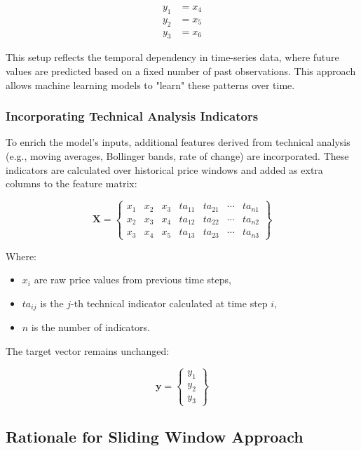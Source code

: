 \documentclass[a4paper,11pt]{article}
\begin{document}
\begin{align*}
y_1 &= x_4 \\
y_2 &= x_5 \\
y_3 &= x_6
\end{align*}

This setup reflects the temporal dependency in time-series data, where future values are predicted based on a fixed number of past observations. This approach allows machine learning models to "learn" these patterns over time.

\subsubsection{Incorporating Technical Analysis Indicators}

To enrich the model’s inputs, additional features derived from technical analysis (e.g., moving averages, Bollinger bands, rate of change) are incorporated. These indicators are calculated over historical price windows and added as extra columns to the feature matrix:

\begin{equation*}
\mathbf{X} = \begin{Bmatrix}
x_1 & x_2 & x_3 & ta_{11} & ta_{21} & \cdots & ta_{n1}\\
x_2 & x_3 & x_4 & ta_{12} & ta_{22} & \cdots & ta_{n2}\\
x_3 & x_4 & x_5 & ta_{13} & ta_{23} & \cdots & ta_{n3}
\end{Bmatrix}
\end{equation*}

Where:
\begin{itemize}
    \item $x_i$ are raw price values from previous time steps,
    \item $ta_{ij}$ is the $j$-th technical indicator calculated at time step $i$,
    \item $n$ is the number of indicators.
\end{itemize}

The target vector remains unchanged:

\begin{equation*}
\mathbf{y} = \begin{Bmatrix}
y_1 \\
y_2 \\
y_3
\end{Bmatrix}
\end{equation*}

\subsection{Rationale for Sliding Window Approach}
\end{document}
